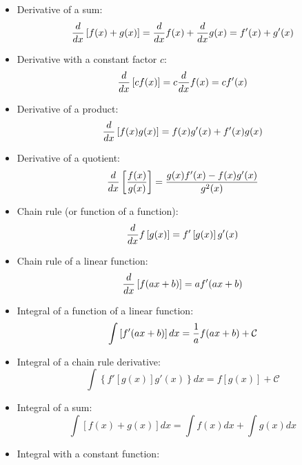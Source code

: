 \begin{itemize}
%
  \item Derivative of a sum:
    \begin{displaymath}
       \displaystyle\frac{d}{dx}\left[f(x)+g(x)\right] = \displaystyle\frac{d}{dx}f(x) + \displaystyle\frac{d}{dx}g(x) = f'(x)+g'(x) 
    \end{displaymath}
%
  \item Derivative with a constant factor $c$:
    \begin{displaymath}
       \displaystyle\frac{d}{dx}\left[c f(x)\right] = c\displaystyle\frac{d}{dx}f(x) = cf'(x)
    \end{displaymath}
%
  \item Derivative of a product:
    \begin{displaymath}
       \displaystyle\frac{d}{dx}\left[f(x)g(x)\right] = f(x)g'(x) + f'(x)g(x)
    \end{displaymath}
%
  \item Derivative of a quotient:
    \begin{displaymath}
      \displaystyle\frac{d}{dx}\left[\displaystyle\frac{f(x)}{g(x)}\right] = \displaystyle\frac{g(x)f'(x)-f(x)g'(x)}{g^{2}(x)}
    \end{displaymath}
%
  \item Chain rule (or function of a function):
    \begin{displaymath}
      \displaystyle\frac{d}{dx}f\left[g(x)\right] = f'\left[g(x)\right]g'(x)
    \end{displaymath}
%
  \item Chain rule of a linear function:
    \begin{displaymath}
      \displaystyle\frac{d}{dx} \left[f(ax+b)\right] = a f'(ax+b)
    \end{displaymath}
%
  \item Integral of a function of a linear function:
    \begin{displaymath}
       \int\left[f'(ax+b)\right]dx = \displaystyle\frac{1}{a}f(ax+b) + \mathcal{C}
    \end{displaymath}
%
  \item Integral of a chain rule derivative:
    \begin{displaymath}
       \int\left\{f'\left[g(x)\right]g'(x)\right\}dx = f\left[g(x)\right] + \mathcal{C}
    \end{displaymath}
%
  \item Integral of a sum:
    \begin{displaymath}
      \int\left[f(x)+g(x)\right]dx = \int f(x)dx + \int g(x)dx
    \end{displaymath}
%
  \item Integral with a constant function:

\end{itemize}
